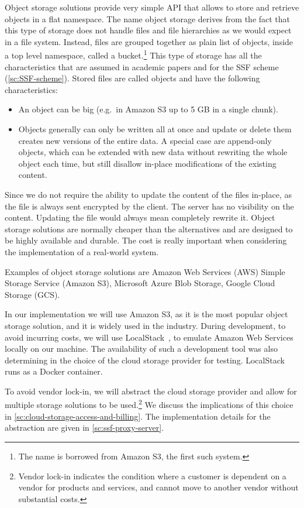 Object storage solutions provide
very simple API that allows to store and retrieve
objects in a flat namespace.
The name object storage derives from the fact that this type
of storage does not handle files and file hierarchies 
as we would expect in a file system. Instead,
files are grouped together as plain list of objects,
inside a top level namespace, called a bucket.\footnote{The name is borrowed from Amazon S3, the first such system.}
This type of storage has all the characteristics that are assumed
in academic papers and
for the SSF scheme (\cref{sc:SSF-scheme}).
Stored files are called objects and have the following characteristics:
\begin{itemize}
    \item An object can be big (e.g.\ in Amazon S3 up to 5 GB in a single chunk).
    \item Objects generally can only be written all at once and update or delete them creates new versions of the entire data. A special case are append-only objects, which can be extended with new data without rewriting the whole object each time, but still disallow in-place modifications of the existing content.
\end{itemize} 

Since we do not require the ability to update the content of the files in-place,
as the file is always sent encrypted by the client. The server has no visibility 
on the content. Updating the file
would always mean completely rewrite it.
Object storage solutions are normally cheaper than the alternatives
and are designed to be highly available and durable.
The cost is really important when considering the implementation
of a real-world system.

Examples of object storage solutions are Amazon Web Services (AWS)
Simple Storage Service (Amazon S3), Microsoft Azure Blob Storage, Google Cloud Storage (GCS).

In our implementation we will use Amazon S3, as it is the most
popular object storage solution, and it is widely used in the industry.
During development, to avoid incurring costs, we will use LocalStack~\cite{LocalStack},
to emulate Amazon Web Services locally on our machine. The availability
of such a development tool was also determining in the choice
of the cloud storage provider for testing. LocalStack
runs as a Docker container.

To avoid vendor lock-in, we will abstract the cloud storage provider
and allow for multiple storage solutions to be used.\footnote{Vendor lock-in indicates the condition where a customer is dependent on a vendor for products and services, and cannot move to another vendor without substantial costs.}
We discuss the implications of this choice in \cref{sc:cloud-storage-access-and-billing}.
The implementation details for the abstraction are given in \cref{sc:ssf-proxy-server}.


